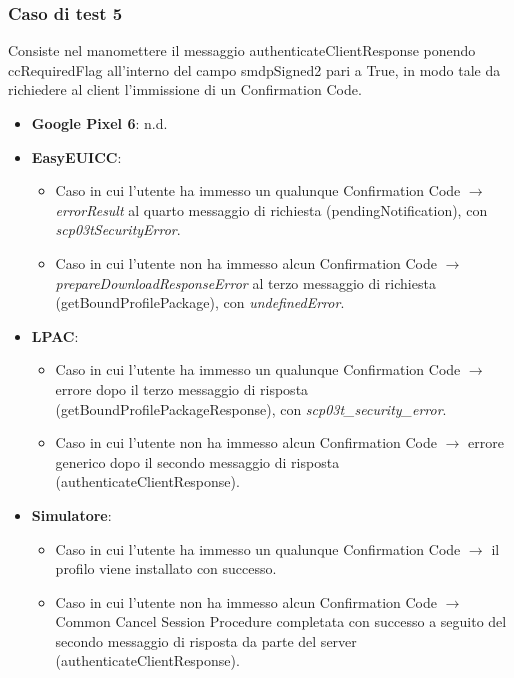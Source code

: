 \documentclass[10pt, oneside]{book}
\begin{document}
\subsubsection{Caso di test 5}
Consiste nel manomettere il messaggio authenticateClientResponse ponendo ccRequiredFlag all'interno del campo smdpSigned2 pari a True, in modo tale da richiedere al client l'immissione di un Confirmation Code.
\begin{itemize}
\item \textbf{Google Pixel 6}: n.d.
\item \textbf{EasyEUICC}:
\begin{itemize}
\item Caso in cui l'utente ha immesso un qualunque Confirmation Code $\rightarrow$ \textit{errorResult} al quarto messaggio di richiesta (pendingNotification), con \textit{scp03tSecurityError}.
\item Caso in cui l'utente non ha immesso alcun Confirmation Code $\rightarrow$ \textit{prepareDownloadResponseError} al terzo messaggio di richiesta (getBoundProfilePackage), con \textit{undefinedError}.
\end{itemize}
\item \textbf{LPAC}:
\begin{itemize}
\item Caso in cui l'utente ha immesso un qualunque Confirmation Code $\rightarrow$ errore dopo il terzo messaggio di risposta (getBoundProfilePackageResponse), con \textit{scp03t\_security\_error}.
\item Caso in cui l'utente non ha immesso alcun Confirmation Code $\rightarrow$ errore generico dopo il secondo messaggio di risposta (authenticateClientResponse).
\end{itemize}
\item \textbf{Simulatore}:
\begin{itemize}
\item Caso in cui l'utente ha immesso un qualunque Confirmation Code $\rightarrow$ il profilo viene installato con successo.
\item Caso in cui l'utente non ha immesso alcun Confirmation Code $\rightarrow$ Common Cancel Session Procedure completata con successo a seguito del secondo messaggio di risposta da parte del server (authenticateClientResponse).
\end{itemize}
\end{itemize}
\end{document}
